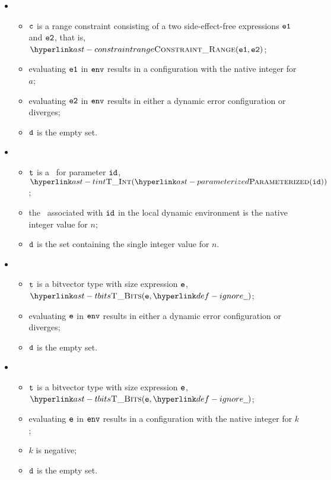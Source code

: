 \begin{itemize}
  \item {}
  \begin{itemize}
    \item $\texttt{c}$ is a range constraint consisting of a two side-effect-free expressions $\texttt{e1}$ and $\texttt{e2}$, that is, $\ConstraintRange(\veone, \vetwo)$;
    \item evaluating $\texttt{e1}$ in $\texttt{env}$ results in a configuration with the native integer for $a$;
    \item evaluating $\texttt{e2}$ in $\texttt{env}$ results in either a dynamic error configuration or diverges;
    \item $\texttt{d}$ is the empty set.
  \end{itemize}

  \item {}
  \begin{itemize}
    \item $\texttt{t}$ is a \parameterizedintegertype\ for parameter $\texttt{id}$, \\ $\TInt(\parameterized(\id))$;
    \item the \nativevalue\ associated with $\texttt{id}$ in the local dynamic environment is the native integer value for $n$;
    \item $\texttt{d}$ is the set containing the single integer value for $n$.
  \end{itemize}

  \item {}
  \begin{itemize}
    \item $\texttt{t}$ is a bitvector type with size expression $\texttt{e}$, $\TBits(\ve, \Ignore)$;
    \item evaluating $\texttt{e}$ in $\texttt{env}$ results in either a dynamic error configuration or diverges;
    \item $\texttt{d}$ is the empty set.
  \end{itemize}

  \item {}
  \begin{itemize}
    \item $\texttt{t}$ is a bitvector type with size expression $\texttt{e}$, $\TBits(\ve, \Ignore)$;
    \item evaluating $\texttt{e}$ in $\texttt{env}$ results in a configuration with the native integer for $k$;
    \item $k$ is negative;
    \item $\texttt{d}$ is the empty set.
  \end{itemize}


\end{itemize}
